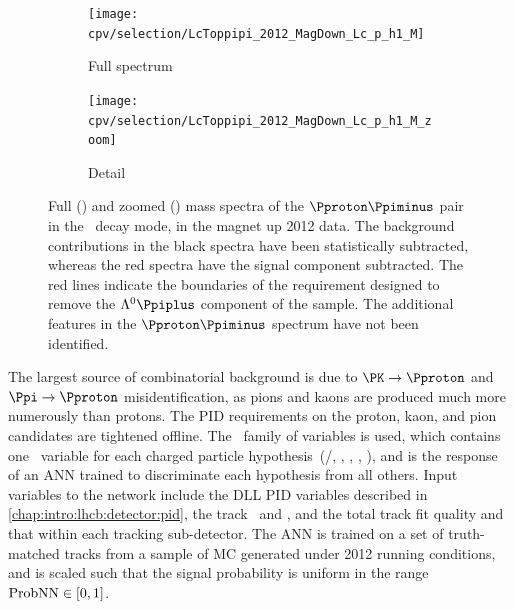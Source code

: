 \begin{figure}
  \begin{subfigure}[b]{0.5\textwidth}
    \texttt{[image: cpv/selection/LcToppipi\_2012\_MagDown\_Lc\_p\_h1\_M]}
    \caption{Full spectrum}
    \label{fig:cpv:selection:ppipi_lambda_cut:full}
  \end{subfigure}
  \begin{subfigure}[b]{0.5\textwidth}
    \texttt{[image: cpv/selection/LcToppipi\_2012\_MagDown\_Lc\_p\_h1\_M\_zoom]}
    \caption{Detail}
    \label{fig:cpv:selection:ppipi_lambda_cut:zoom}
  \end{subfigure}
  \caption{%
    Full () and zoomed 
    () mass spectra of the 
    $\Pproton\Ppiminus$ pair in the \ppipi\ decay mode, in
    the magnet up 2012 data.
    The background contributions in the black spectra have been statistically
    subtracted, whereas the red spectra have the signal component subtracted.
    The red lines indicate the boundaries of the requirement designed to remove
    the $\PLambda\Ppiplus$ component of the sample.
    The additional features in the $\Pproton\Ppiminus$ spectrum have not been
    identified.
  }
  \label{fig:cpv:selection:ppipi_lambda_cut}
\end{figure}

The largest source of combinatorial background is due to $\PK \to \Pproton$ and
$\Ppi \to \Pproton$ misidentification, as pions and kaons are produced much
more numerously than protons.
The \ac{PID} requirements on the proton, kaon, and pion candidates are
tightened offline.
The \probnn\ family of variables is used, which contains one \probnn\ variable
for each charged particle hypothesis~(\Pproton/\APproton, \PKpm, \Ppipm,
\Pmupm, \Pepm), and is the response of an \ac{ANN} trained to discriminate each
hypothesis from all others.
Input variables to the network include the \ac{DLL} \ac{PID} variables
described in \cref{chap:intro:lhcb:detector:pid}, the track \ptot\ and \pT, and
the total track fit quality and that within each tracking sub-detector.
The \ac{ANN} is trained on a set of truth-matched tracks from a sample of
\ac{MC} generated under 2012 running conditions, and is scaled such that the
signal probability is uniform in the range $\text{ProbNN} \in [0, 1]$.

